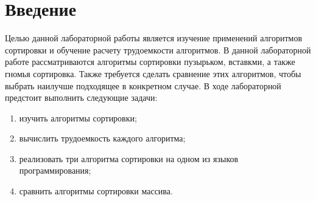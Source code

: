 \documentclass[a4paper, 12pt]{article}
\begin{document}
\tableofcontents
\clearpage
\newpage

\section*{Введение}

\begin{flushleft}
	\hspace*{5mm} Целью данной лабораторной работы является изучение применений алгоритмов сортировки и обучение расчету трудоемкости алгоритмов. В данной лабораторной работе рассматриваются алгоритмы сортировки пузырьком,  вставкми, а также гномья сортировка. Также требуется сделать сравнение этих алгоритмов, чтобы выбрать наилучше подходящее в конкретном случае. 
	\newline \hspace*{5mm} В ходе лабораторной предстоит выполнить следующие задачи: 
	\begin{enumerate}
		\item изучить алгоритмы сортировки;
		\item вычислить трудоемкость каждого алгоритма;
		\item реализовать три алгоритма сортировки на одном из языков программирования;
		\item сравнить алгоритмы сортировки массива.
    \end{enumerate}
		
\end{flushleft}
\clearpage
\newpage
\end{document}
